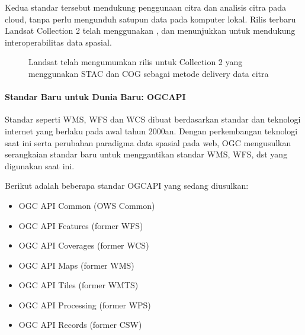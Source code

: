 \documentclass[letterpaper,10pt,english]{sphinxmanual}
\let\sphinxpxdimen\pdfpxdimen\else\newdimen\sphinxpxdimen
\begin{document}
Kedua standar tersebut mendukung penggunaan citra dan analisis citra pada cloud, tanpa perlu mengunduh satupun data pada komputer lokal. Rilis terbaru Landsat Collection 2 telah menggunakan , dan menunjukkan  untuk mendukung interoperabilitas data spasial.

\begin{figure}[htbp]
\centering
\capstart

\noindent\sphinxincludegraphics[height=300\sphinxpxdimen]{{2020-12-04-04-33-50}.png}
\caption{Landsat telah mengumumkan rilis untuk Collection 2 yang menggunakan STAC dan COG sebagai metode delivery data citra}\label{\detokenize{sesi3/interoperabilitas:landsatcol2}}\end{figure}


\paragraph{Standar Baru untuk Dunia Baru: OGC\sphinxhyphen{}API}
\label{\detokenize{sesi3/interoperabilitas:standar-baru-untuk-dunia-baru-ogc-api}}
Standar seperti WMS, WFS dan WCS dibuat berdasarkan standar dan teknologi internet yang berlaku pada awal tahun 2000an. Dengan perkembangan teknologi saat ini serta perubahan paradigma data spasial pada web, OGC mengusulkan serangkaian standar baru untuk menggantikan standar WMS, WFS, dst yang digunakan saat ini.

Berikut adalah beberapa standar OGC\sphinxhyphen{}API yang sedang diusulkan:
\begin{itemize}
\item {} 
OGC API \sphinxhyphen{} Common (OWS Common)

\item {} 
OGC API \sphinxhyphen{} Features (former WFS)

\item {} 
OGC API \sphinxhyphen{} Coverages (former WCS)

\item {} 
OGC API \sphinxhyphen{} Maps (former WMS)

\item {} 
OGC API \sphinxhyphen{} Tiles (former WMTS)

\item {} 
OGC API \sphinxhyphen{} Processing (former WPS)

\item {} 
OGC API \sphinxhyphen{} Records (former CSW)

\end{itemize}
\end{document}
